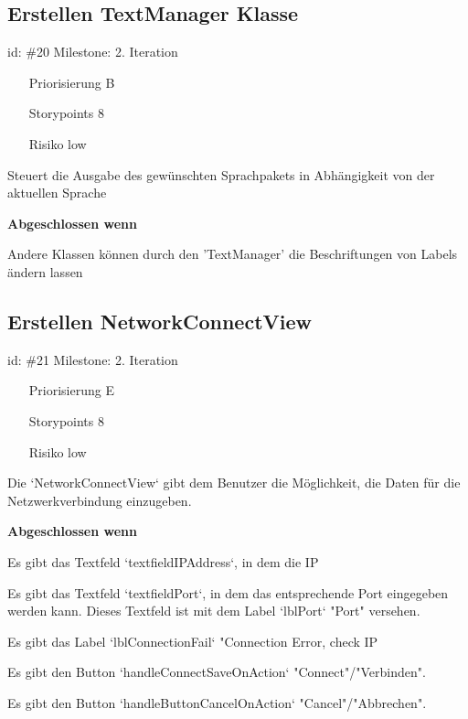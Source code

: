 \subsection*{Erstellen TextManager Klasse}
id: \#20 Milestone: 2. Iteration\\

\begin{itemize}
\item[Priorisierung] B
\item[Storypoints] 8
\item[Risiko] low
\end{itemize}

Steuert die Ausgabe des gewünschten Sprachpakets in Abhängigkeit von der aktuellen Sprache

\textbf{Abgeschlossen wenn}
\begin{todolist}
    \item[\done]  Andere Klassen können durch den 'TextManager' die Beschriftungen von Labels ändern lassen

\end{todolist}


\subsection*{Erstellen NetworkConnectView}
id: \#21 Milestone: 2. Iteration\\

\begin{itemize}
\item[Priorisierung] E
\item[Storypoints] 8
\item[Risiko] low
\end{itemize}

Die `NetworkConnectView` gibt dem Benutzer die Möglichkeit, die Daten für die Netzwerkverbindung einzugeben.

\textbf{Abgeschlossen wenn}
\begin{todolist}
    \item[\done]  Es gibt das Textfeld `textfieldIPAddress`, in dem die IP
  \item[\done]  Es gibt das Textfeld `textfieldPort`, in dem das entsprechende Port eingegeben werden kann. Dieses Textfeld ist mit dem Label `lblPort` "Port" versehen.
  \item[\done]  Es gibt das Label `lblConnectionFail` "Connection Error, check IP
  \item[\done]  Es gibt den Button `handleConnectSaveOnAction` "Connect"/"Verbinden".
  \item[\done]  Es gibt den Button `handleButtonCancelOnAction` "Cancel"/"Abbrechen".

\end{todolist}


